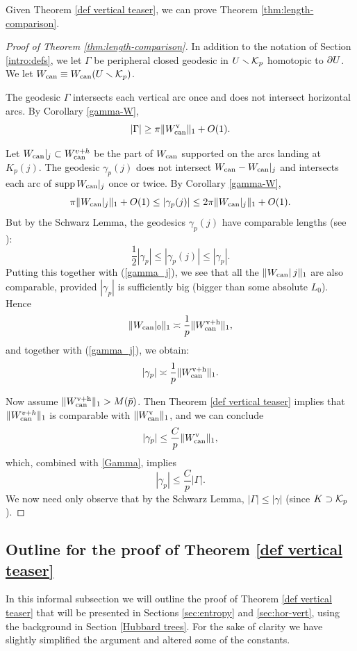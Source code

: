 Given Theorem \ref{def vertical teaser}, we can prove Theorem \ref{thm:length-comparison}.
\begin{proof}[Proof of Theorem \ref{thm:length-comparison}]
In addition to the notation of Section \ref{intro:defs},
we let $\Gamma$ be peripheral closed geodesic in $U\smallsetminus {\mathcal K}_p$ homotopic to $\partial U$. 
We let $W_{\mathrm{can}} \equiv W_{\mathrm{can}}(U\smallsetminus {\mathcal K}_p)$.

The geodesic $\Gamma$ intersects each vertical arc once and does not intersect horizontal arcs.
By  Corollary \ref{gamma-W},
\begin{equation}\label{Gamma}
  |\Gamma| \ge \pi \| W_{\mathrm{can}}^{\mathrm{v}}\|_1 +O(1).
\end{equation}

 Let $W_{\mathrm{can}}|_j \subset W_{\mathrm{can}}^{v+h}$ be the part of $W_{\mathrm{can}}$
supported on the arcs landing at $K_p(j)$. The geodesic $\gamma_p(j)$ does not intersect
$W_{\mathrm{can}} - W_{\mathrm{can}}|_j$ and intersects each arc of $\operatorname{supp} W_{\mathrm{can}}|_j$ once or twice.
By  Corollary \ref{gamma-W},
\begin{equation}\label{gamma_j}
   \pi\| W_{\mathrm{can}}|_j\|_1 + O(1) \le |\gamma_p(j)| \le 2\pi\| W_{\mathrm{can}}|_j\|_1 + O(1).
\end{equation}
But by the Schwarz Lemma, the geodesics $\gamma_p(j)$ have comparable lengths
(see \cite[Theorem 9.3]{McM}):
\begin{equation} \label{eq:compare}
   \frac{1}{2} |\gamma_p| \leq |\gamma_p(j)| \leq |\gamma_p|.
\end{equation}
Putting this together with (\ref{gamma_j}), we see that all the $\| W_{\mathrm{can}}|\, j \|_1 $
are also comparable, provided $|\gamma_p|$ is sufficiently big
(bigger than some absolute $L_0$). Hence
$$
   \| W_{\mathrm{can}}|_0\|_1  \asymp \frac{1}{p} \| W_{\mathrm{can}}^{{\mathrm{v}}+{\mathrm{h}}}\|_1,
$$
and together with (\ref{gamma_j}), we obtain:
$$
     |\gamma_p| \asymp \frac{1}{p} \| W_{\mathrm{can}}^{{\mathrm{v}}+{\mathrm{h}}}\|_1.
$$

Now assume $ \| W_{\mathrm{can}}^{{\mathrm{v}}+{\mathrm{h}}}\|_1 > M(\bar p)$. 
Then Theorem \ref{def vertical teaser} implies that $\| W_{\mathrm{can}}^{v+h}\|_1$ is comparable with $\| W_{\mathrm{can}}^{\mathrm{v}}\|_1 $,
and we can conclude
$$
   | \gamma_p | \leq \frac{ C }{p} \| W_{\mathrm{can}}^{\mathrm{v}}\|_1,
$$
which, 
combined with \eqref{Gamma},
implies
$$
   |\gamma_p| \leq \frac{C}{p} |\Gamma|.
$$
We now need only observe that by the Schwarz Lemma, $|\Gamma| \leq  |\gamma|$ (since $K\supset {\mathcal K}_p$).
\end{proof}

\subsection{Outline for the proof of Theorem \ref{def vertical teaser}} \label{subsec:hv-proof-outline}
In this informal subsection we will outline the proof of Theorem \ref{def vertical teaser} that will be presented in Sections \ref{sec:entropy} and \ref{sec:hor-vert}, using the background in Section \ref{Hubbard trees}.
For the sake of clarity we have slightly simplified the argument and altered some of the constants.


